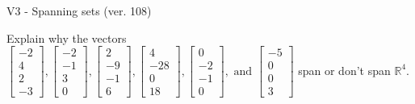 \begin{exercise}
  \begin{exerciseTitle}V3 - Spanning sets (ver. 108)\end{exerciseTitle}
  \begin{exerciseStatement}
    Explain why the vectors \(\left[\begin{array}{r}
-2 \\
4 \\
2 \\
-3
\end{array}\right] , \left[\begin{array}{r}
-2 \\
-1 \\
3 \\
0
\end{array}\right] , \left[\begin{array}{r}
2 \\
-9 \\
-1 \\
6
\end{array}\right] , \left[\begin{array}{r}
4 \\
-28 \\
0 \\
18
\end{array}\right] , \left[\begin{array}{r}
0 \\
-2 \\
-1 \\
0
\end{array}\right] , \text{ and } \left[\begin{array}{r}
-5 \\
0 \\
0 \\
3
\end{array}\right]\) span or don't span \(\mathbb{R}^4\). 
	



\end{exerciseStatement}
\end{exercise}
